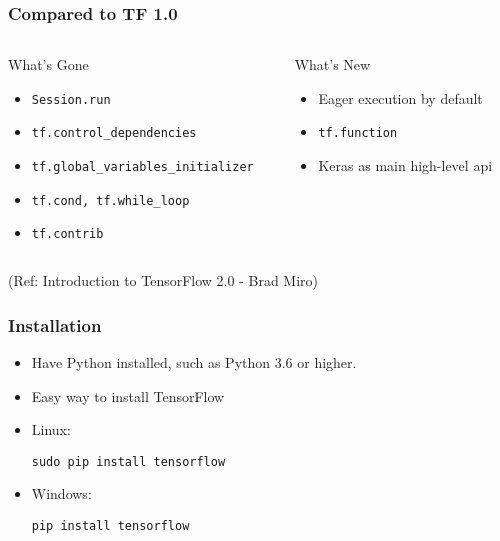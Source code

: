 \begin{frame}[fragile] \frametitle{Compared to TF 1.0}

\begin{columns}
    \begin{column}[T]{0.6\linewidth}
	What’s Gone
      \begin{itemize}
		\item \lstinline|Session.run|
		\item \lstinline|tf.control_dependencies|
		\item \lstinline|tf.global_variables_initializer|
		\item \lstinline|tf.cond, tf.while_loop|
		\item \lstinline|tf.contrib|
	  \end{itemize}

    \end{column}
    \begin{column}[T]{0.4\linewidth}
	What’s New
      \begin{itemize}
		\item Eager execution by default
		\item \lstinline|tf.function|
		\item Keras as main high-level api
	  \end{itemize}
    \end{column}
  \end{columns}

\tiny{(Ref: Introduction to TensorFlow 2.0 - Brad Miro)}
\end{frame}






\begin{frame}[fragile] \frametitle{Installation}

\begin{itemize}
\item Have Python installed, such as Python 3.6 or higher.
\item Easy way to install TensorFlow
\item Linux:
\begin{lstlisting}
sudo pip install tensorflow
\end{lstlisting}
\item Windows:
\begin{lstlisting}
pip install tensorflow
\end{lstlisting}
\end{itemize}

\end{frame}

